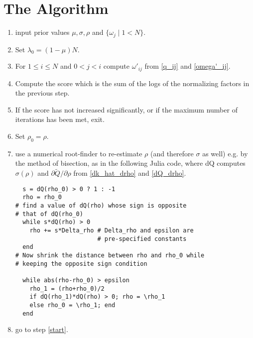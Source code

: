 \documentclass[12pt,leqno]{article}
\begin{document}
\section{The Algorithm}
\begin{enumerate}
  \item input prior values $\mu, \sigma, \rho $ and $\{\omega_j\mid 1 < N\}$.
  \item Set $\lambda_0 = (1-\mu)N$.
  \item For $1\le i\le N$ and $0 < j < i$ compute $\omega'_{ij}$ from \eqref{q_ij} and
    \eqref{omega'_ij}. \label{start}
  \item Compute the score which is the sum of the logs of the normalizing factors in the previous step.
  \item If the score has not increased significantly, or if the maximum number of iterations has been met, exit.
  \item Set $\rho_0 = \rho$.
  \item use a numerical root-finder to re-estimate $\rho$ (and therefore $\sigma$ as well) e.g. by the
    method of bisection, as in the
    following Julia code, where dQ computes $\sigma(\rho)$ and $\partial\tilde{Q}/\partial\rho$ from
    \eqref{dk_hat_drho} and \eqref{dQ_drho}.
\begin{verbatim}
  s = dQ(rho_0) > 0 ? 1 : -1
  rho = rho_0
# find a value of dQ(rho) whose sign is opposite 
# that of dQ(rho_0)
  while s*dQ(rho) > 0 
    rho += s*Delta_rho # Delta_rho and epsilon are 
                       # pre-specified constants
  end
# Now shrink the distance between rho and rho_0 while 
# keeping the opposite sign condition

  while abs(rho-rho_0) > epsilon 
    rho_1 = (rho+rho_0)/2
    if dQ(rho_1)*dQ(rho) > 0; rho = \rho_1
    else rho_0 = \rho_1; end
  end
\end{verbatim}
  \item go to step \ref{start}.
\end{enumerate}
    
    
    
    
\end{document}
